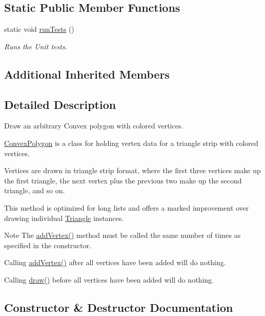 \subsection*{Static Public Member Functions}
\begin{DoxyCompactItemize}
\item 
static void \hyperlink{classtsgl_1_1_convex_polygon_ac309bc2b2f142b0a02b9dc38e901daeb}{run\+Tests} ()
\begin{DoxyCompactList}\small\item\em Runs the Unit tests. \end{DoxyCompactList}\end{DoxyCompactItemize}
\subsection*{Additional Inherited Members}


\subsection{Detailed Description}
Draw an arbitrary Convex polygon with colored vertices. 

\hyperlink{classtsgl_1_1_convex_polygon}{Convex\+Polygon} is a class for holding vertex data for a triangle strip with colored vertices.

Vertices are drawn in triangle strip format, where the first three vertices make up the first triangle, the next vertex plus the previous two make up the second triangle, and so on.

This method is optimized for long lists and offers a marked improvement over drawing individual \hyperlink{classtsgl_1_1_triangle}{Triangle} instances. \begin{DoxyNote}{Note}
The \hyperlink{classtsgl_1_1_convex_polygon_a60d17a5ac80a796d05dfeff855791cc0}{add\+Vertex()} method must be called the same number of times as specified in the constructor. 

Calling \hyperlink{classtsgl_1_1_convex_polygon_a60d17a5ac80a796d05dfeff855791cc0}{add\+Vertex()} after all vertices have been added will do nothing. 

Calling \hyperlink{classtsgl_1_1_convex_polygon_add4d4971a5d22385eebbfe771af916b5}{draw()} before all vertices have been added will do nothing. 
\end{DoxyNote}


\subsection{Constructor \& Destructor Documentation}
\hypertarget{classtsgl_1_1_convex_polygon_ae9d826f3b3155fe84016e6efbcbd2b64}{}

